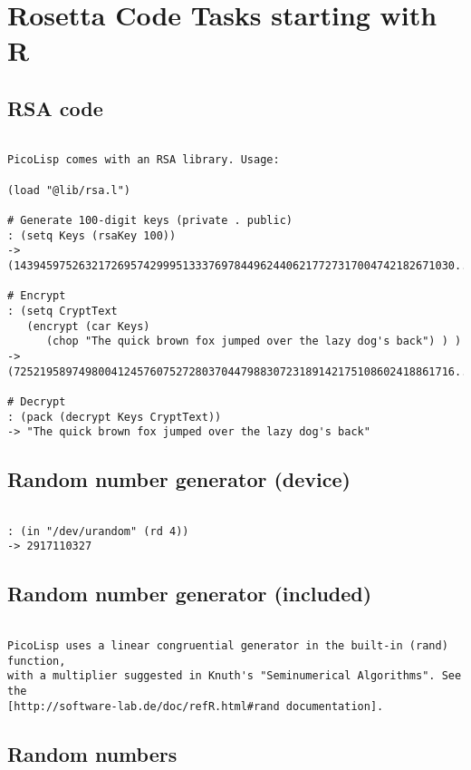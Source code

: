 \chapter{Rosetta Code Tasks starting with R}

\section*{RSA code}

\begin{verbatim}

PicoLisp comes with an RSA library. Usage:

(load "@lib/rsa.l")

# Generate 100-digit keys (private . public)
: (setq Keys (rsaKey 100))
-> (14394597526321726957429995133376978449624406217727317004742182671030....

# Encrypt
: (setq CryptText
   (encrypt (car Keys)
      (chop "The quick brown fox jumped over the lazy dog's back") ) )
-> (72521958974980041245760752728037044798830723189142175108602418861716...

# Decrypt
: (pack (decrypt Keys CryptText))
-> "The quick brown fox jumped over the lazy dog's back"

\end{verbatim}

\section*{Random number generator (device)}

\begin{verbatim}

: (in "/dev/urandom" (rd 4))
-> 2917110327

\end{verbatim}

\section*{Random number generator (included)}

\begin{verbatim}

PicoLisp uses a linear congruential generator in the built-in (rand) function,
with a multiplier suggested in Knuth's "Seminumerical Algorithms". See the
[http://software-lab.de/doc/refR.html#rand documentation].

\end{verbatim}

\section*{Random numbers}

